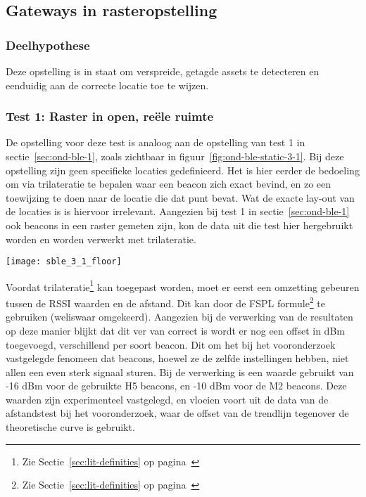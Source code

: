 \subsection{Gateways in rasteropstelling}
\label{sec:ond-ble-3}
\subsubsection{Deelhypothese}
Deze opstelling is in staat om verspreide, getagde assets te detecteren en eenduidig aan de correcte locatie toe te wijzen.

\subsubsection{Test 1: Raster in open, reële ruimte}
\label{sec:ond-ble-3-1}
\begin{minipage}{0.55\textwidth}
De opstelling voor deze test is analoog aan de opstelling van test 1 in sectie~\ref{sec:ond-ble-1}, zoals zichtbaar in figuur~\ref{fig:ond-ble-static-3-1}. Bij deze opstelling zijn geen specifieke locaties gedefinieerd. Het is hier eerder de bedoeling om via trilateratie te bepalen waar een beacon zich exact bevind, en zo een toewijzing te doen naar de locatie die dat punt bevat. Wat de exacte lay-out van de locaties is is hiervoor irrelevant. Aangezien bij test 1 in sectie~\ref{sec:ond-ble-1} ook beacons in een raster gemeten zijn, kon de data uit die test hier hergebruikt worden en worden verwerkt met trilateratie. 
\end{minipage}
\hfill
\begin{minipage}{0.42\textwidth}
	\texttt{[image: sble\_3\_1\_floor]}
	\label{fig:ond-ble-static-3-1}
\end{minipage}

Voordat trilateratie\footnote{Zie Sectie~\ref{sec:lit-definities} op pagina~\pageref{sec:lit-definities}} kan toegepast worden, moet er eerst een omzetting gebeuren tussen de RSSI waarden en de afstand. Dit kan door de FSPL formule\footnote{Zie Sectie~\ref{sec:lit-definities} op pagina~\pageref{sec:lit-definities}} te gebruiken (weliswaar omgekeerd). Aangezien bij de verwerking van de resultaten op deze manier blijkt dat dit ver van correct is wordt er nog een offset in dBm toegevoegd, verschillend per soort beacon. Dit om het bij het vooronderzoek vastgelegde fenomeen dat beacons, hoewel ze de zelfde instellingen hebben, niet allen een even sterk signaal sturen. Bij de verwerking is een waarde gebruikt van -16 dBm voor de gebruikte H5 beacons, en -10 dBm voor de M2 beacons. Deze waarden zijn experimenteel vastgelegd, en vloeien voort uit de data van de afstandstest bij het vooronderzoek, waar de offset van de trendlijn tegenover de theoretische curve is gebruikt.

